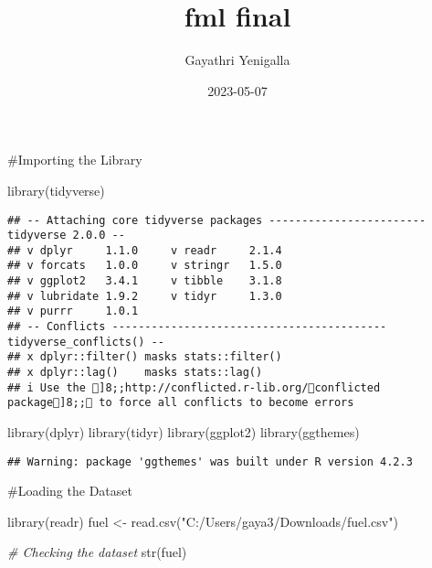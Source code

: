 \documentclass[
]{article}
\title{fml final}
\author{Gayathri Yenigalla}
\date{2023-05-07}
\newenvironment{Shaded}{\begin{snugshade}}{\end{snugshade}}
\newcommand{\CommentTok}[1]{\textcolor[rgb]{0.56,0.35,0.01}{\textit{#1}}}
\newcommand{\FunctionTok}[1]{\textcolor[rgb]{0.00,0.00,0.00}{#1}}
\newcommand{\NormalTok}[1]{#1}
\newcommand{\OtherTok}[1]{\textcolor[rgb]{0.56,0.35,0.01}{#1}}
\newcommand{\StringTok}[1]{\textcolor[rgb]{0.31,0.60,0.02}{#1}}
\begin{document}
\maketitle

\#Importing the Library

\begin{Shaded}
\begin{Highlighting}[]
\FunctionTok{library}\NormalTok{(tidyverse)}
\end{Highlighting}
\end{Shaded}

\begin{verbatim}
## -- Attaching core tidyverse packages ------------------------ tidyverse 2.0.0 --
## v dplyr     1.1.0     v readr     2.1.4
## v forcats   1.0.0     v stringr   1.5.0
## v ggplot2   3.4.1     v tibble    3.1.8
## v lubridate 1.9.2     v tidyr     1.3.0
## v purrr     1.0.1     
## -- Conflicts ------------------------------------------ tidyverse_conflicts() --
## x dplyr::filter() masks stats::filter()
## x dplyr::lag()    masks stats::lag()
## i Use the ]8;;http://conflicted.r-lib.org/conflicted package]8;; to force all conflicts to become errors
\end{verbatim}

\begin{Shaded}
\begin{Highlighting}[]
\FunctionTok{library}\NormalTok{(dplyr)}
\FunctionTok{library}\NormalTok{(tidyr)}
\FunctionTok{library}\NormalTok{(ggplot2)}
\FunctionTok{library}\NormalTok{(ggthemes)}
\end{Highlighting}
\end{Shaded}

\begin{verbatim}
## Warning: package 'ggthemes' was built under R version 4.2.3
\end{verbatim}

\#Loading the Dataset

\begin{Shaded}
\begin{Highlighting}[]
\FunctionTok{library}\NormalTok{(readr)}
\NormalTok{fuel }\OtherTok{\textless{}{-}} \FunctionTok{read.csv}\NormalTok{(}\StringTok{"C:/Users/gaya3/Downloads/fuel.csv"}\NormalTok{)}
\end{Highlighting}
\end{Shaded}

\begin{Shaded}
\begin{Highlighting}[]
\CommentTok{\# Checking the dataset}
\FunctionTok{str}\NormalTok{(fuel)}
\end{Highlighting}
\end{Shaded}
\end{document}
